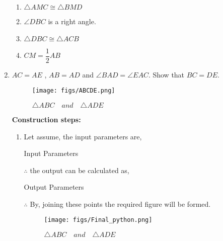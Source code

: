 \begin{enumerate}[label=\thesection.\arabic*,ref=\thesection.\theenumi]
\begin{enumerate}
\item $\triangle AMC \cong \triangle BMD$
\item $\angle DBC$ is a right angle.
\item $\triangle DBC \cong \triangle ACB$
\item $CM = \dfrac{1}{2}AB$
\end{enumerate}
\label{chapters/9/7/1/8}

\item $AC = AE$ , $AB = AD$ and $\angle BAD = \angle EAC$. Show that $BC = DE$.
\begin{figure}[H]
    \texttt{[image: figs/ABCDE.png]}
	\caption{$\triangle ABC \hspace{12pt} and \hspace{12pt} \triangle ADE $}
 \label{fig:Triangle}
\end{figure}
\textbf{Construction steps:}
		\begin{enumerate}[label=(\roman*)]
\item Let assume, the input parameters are, 
\begin{table}[H]
\centering
	
	  \caption{Input Parameters}
	  \label{Input Parameter }
\end{table}
$\therefore$ the output can be calculated as,
\begin{table}[H]
\centering
	
	  \caption{Output Parameters}
	  \label{Output Parameters}
\end{table}
$\therefore$ By, joining these points the required figure will be formed.
\begin{figure}[H]
    \texttt{[image: figs/Final\_python.png]}
	\caption{$\triangle ABC \hspace{12pt} and \hspace{12pt} \triangle ADE$}
    \label{fig:Final triangle}
\end{figure}
\end{enumerate}
\end{enumerate}
